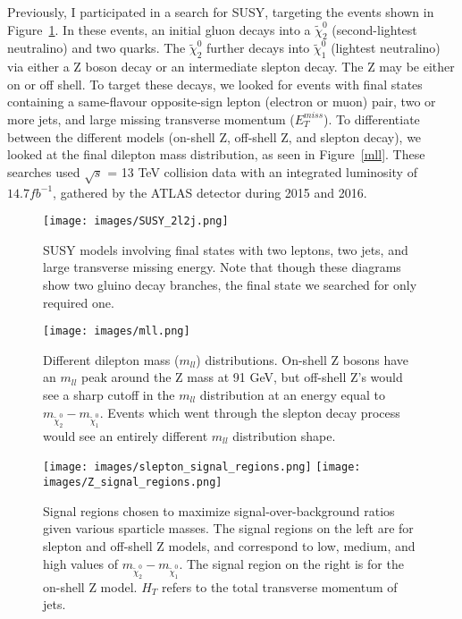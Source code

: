 
Previously, I participated in a search for SUSY, targeting the events shown in Figure~\ref{SUSY_2l2j}. In these events, an initial gluon decays into a $\tilde{\chi}^0_2$ (second-lightest neutralino) and two quarks. The $\tilde{\chi}^0_2$ further decays into $\tilde{\chi}^0_1$ (lightest neutralino) via either a Z boson decay or an intermediate slepton decay. The Z may be either on or off shell. To target these decays, we looked for events with final states containing a same-flavour opposite-sign lepton (electron or muon) pair, two or more jets, and large missing transverse momentum ($E_T^{miss}$). To differentiate between the different models (on-shell Z, off-shell Z, and slepton decay), we looked at the final dilepton mass distribution, as seen in Figure~\ref{mll}. These searches used $\sqrt{s}$ = 13 TeV collision data with an integrated luminosity of $14.7 fb^{-1}$, gathered by the ATLAS detector during 2015 and 2016.

\begin{figure}[t]
    \centering
    \texttt{[image: images/SUSY\_2l2j.png]}
    \caption{SUSY models involving final states with two leptons, two jets, and large transverse missing energy. Note that though these diagrams show two gluino decay branches, the final state we searched for only required one.}
    \label{SUSY_2l2j}
\end{figure}

\begin{figure}[t]
    \centering
    \texttt{[image: images/mll.png]}
    \caption{Different dilepton mass ($m_{ll}$) distributions. On-shell Z bosons have an $m_{ll}$ peak around the Z mass at 91 GeV, but off-shell Z's would see a sharp cutoff in the $m_{ll}$ distribution at an energy equal to $m_{\tilde{\chi}^0_2} - m_{\tilde{\chi}^0_1}$. Events which went through the slepton decay process would see an entirely different $m_{ll}$ distribution shape.}
    \label{mll}
    
	\centering
    \texttt{[image: images/slepton\_signal\_regions.png]}
    \texttt{[image: images/Z\_signal\_regions.png]}
    \caption{Signal regions chosen to maximize signal-over-background ratios given various sparticle masses. The signal regions on the left are for slepton and off-shell Z models, and correspond to low, medium, and high values of $m_{\tilde{\chi}^0_2} - m_{\tilde{\chi}^0_1}$. The signal region on the right is for the on-shell Z model. $H_T$ refers to the total transverse momentum of jets.}
    \label{signal_regions}
\end{figure}


